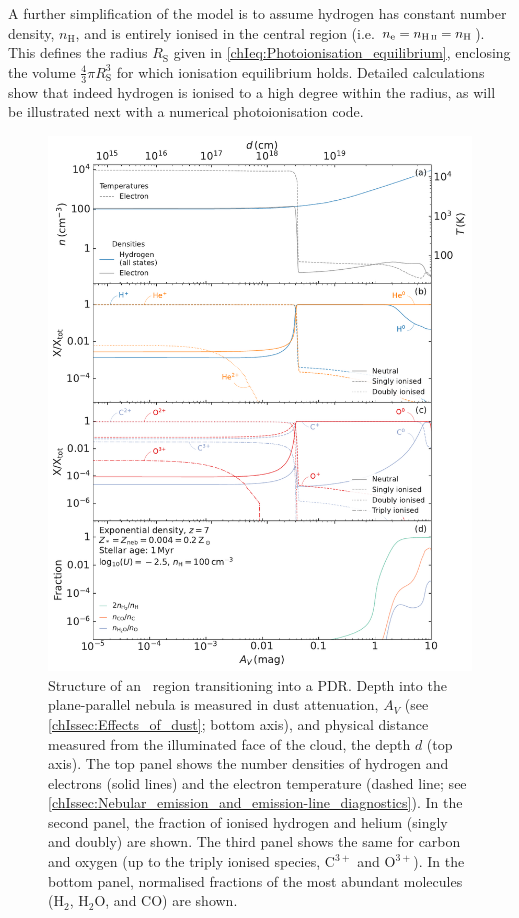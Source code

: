 A further simplification of the model is to assume hydrogen has constant number density, $n_\text{H}$, and is entirely ionised in the central region (i.e. $n_\text{e} = n_\text{\HII} = n_\text{H}$). This defines the \citeauthor{1939ApJ....89..526S} radius $R_\text{S}$ given in \cref{chIeq:Photoionisation_equilibrium}, enclosing the volume $\frac{4}{3} \pi R_\text{S}^3$ for which ionisation equilibrium holds. Detailed calculations show that indeed hydrogen is ionised to a high degree within the \citeauthor{1939ApJ....89..526S} radius, as will be illustrated next with a numerical photoionisation code.
\begin{figure}
    \centering
    \includegraphics[width=0.95\linewidth]{"Figs/Cloudy_PDR_structure"}
    \caption[Structure of an \HII\ region transitioning into a PDR]
    {Structure of an \HII\ region transitioning into a PDR. Depth into the plane-parallel nebula is measured in dust attenuation, $A_V$ (see \cref{chIssec:Effects_of_dust}; bottom axis), and physical distance measured from the illuminated face of the cloud, the depth $d$ (top axis). The top panel shows the number densities of hydrogen and electrons (solid lines) and the electron temperature (dashed line; see \cref{chIssec:Nebular_emission_and_emission-line_diagnostics}). In the second panel, the fraction of ionised hydrogen and helium (singly and doubly) are shown. The third panel shows the same for carbon and oxygen (up to the triply ionised species, $\mathrm{C^{3+}}$ and $\mathrm{O^{3+}}$). In the bottom panel, normalised fractions of the most abundant molecules ($\mathrm{H_2}$, $\mathrm{H_2 O}$, and $\mathrm{CO}$) are shown.}
    \label{appIfig:Cloudy_PDR_structure}
\end{figure}

